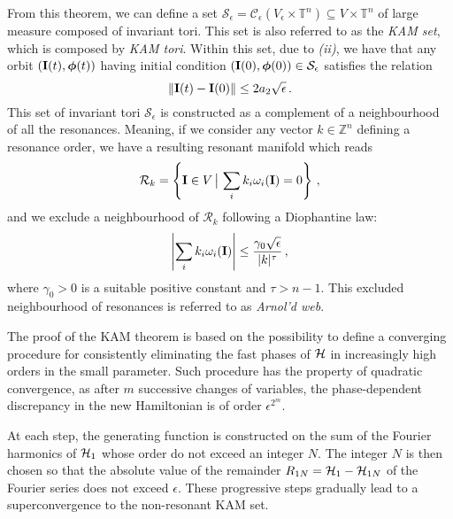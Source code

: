 From this theorem, we can define a set $\mathcal{S}_\epsilon = \mathcal{C}_\epsilon(V_\epsilon \times \mathbb{T}^n) \subseteq V \times \mathbb{T}^n$ of large measure composed of invariant tori. This set is also referred to as the \textit{KAM set}, which is composed by \textit{KAM tori}. Within this set, due to \textit{(ii)}, we have that any orbit $(\vb{I}(t), \boldsymbol{\phi}(t))$ having initial condition $(\vb{I}(0), \boldsymbol{\phi}(0)) \in \mathcal{S}_\epsilon$ satisfies the relation
\begin{equation}
    \norm{\vb{I}(t) - \vb{I}(0)} \leq 2 a_2 \sqrt{\epsilon} \,.
\end{equation}
This set of invariant tori $\mathcal{S}_\epsilon$ is constructed as a complement of a neighbourhood of all the resonances. Meaning, if we consider any vector $k\in \mathbb{Z}^n$ defining a resonance order, we have a resulting resonant manifold which reads
\begin{equation}
    \mathcal{R}_k = \left\{\vb{I}\in V \, \big| \, \sum_i k_i \omega_i(\vb{I}) = 0\right\} \,,
\end{equation}  
and we exclude a neighbourhood of $\mathcal{R}_k$ following a Diophantine law:
\begin{equation}
    \left|\sum_i k_i \omega_i(\vb{I})\right| \leq \frac{\gamma_0 \sqrt{\epsilon}}{|k|^\tau} \,,
    \label{eq:Diophantine-law}
\end{equation}
where $\gamma_0 > 0$ is a suitable positive constant and $\tau > n-1$. This excluded neighbourhood of resonances is referred to as \textit{Arnol'd web}.

The proof of the KAM theorem is based on the possibility to define a converging procedure for consistently eliminating the fast phases of $\mathcal{H}$ in increasingly high orders in the small parameter. Such procedure has the property of quadratic convergence, as after $m$ successive changes of variables, the phase-dependent discrepancy in the new Hamiltonian is of order $\epsilon^{2^m}$.

At each step, the generating function is constructed on the sum of the Fourier harmonics of $\mathcal{H}_1$ whose order do not exceed an integer $N$. The integer $N$ is then chosen so that the absolute value of the remainder $R_{1N} = \mathcal{H}_1 - \mathcal{H}_{1N}$ of the Fourier series does not exceed $\epsilon$. These progressive steps gradually lead to a superconvergence to the non-resonant KAM set.

